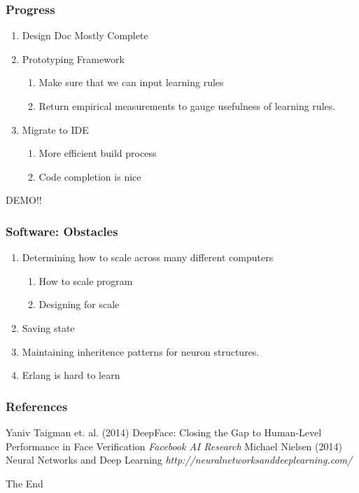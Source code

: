 \documentclass{beamer}
\begin{document}
    \begin{frame}
    	\frametitle{Progress}
        \begin{enumerate}
          
          \item Design Doc Mostly Complete
          \item Prototyping Framework
          \begin{enumerate}
              \item Make sure that we can input learning rules 	
              \item Return empirical measurements to gauge usefulness of learning rules.
          \end{enumerate}
          \item Migrate to IDE
          \begin{enumerate}
              \item More efficient build process
              \item Code completion is nice
          \end{enumerate}
		\end{enumerate}
    \end{frame}
    \begin{frame}
    \Huge{\centerline{DEMO!!}}
    \end{frame}
    \begin{frame}
    \frametitle{Software: Obstacles}
    \begin{enumerate}
    \item Determining how to scale across many different computers
    \begin{enumerate}
	    \item How to scale program
        \item Designing for scale
    \end{enumerate}
    \item Saving state
    \item Maintaining inheritence patterns for neuron structures.
    \item Erlang is hard to learn
    \end{enumerate}
    \end{frame}
   

\begin{frame}
\frametitle{References}
\footnotesize{
    \begin{thebibliography}{99} %
         Yaniv Taigman et. al. (2014)
        \newblock DeepFace: Closing the Gap to Human-Level Performance in Face Verification
        \newblock \emph{Facebook AI Research}
         Michael Nielsen (2014)
        \newblock Neural Networks and Deep Learning
        \newblock \emph{http://neuralnetworksanddeeplearning.com/}
        
    \end{thebibliography}
}
\end{frame}


\begin{frame}
\Huge{\centerline{The End}}
\end{frame}

\end{document}
